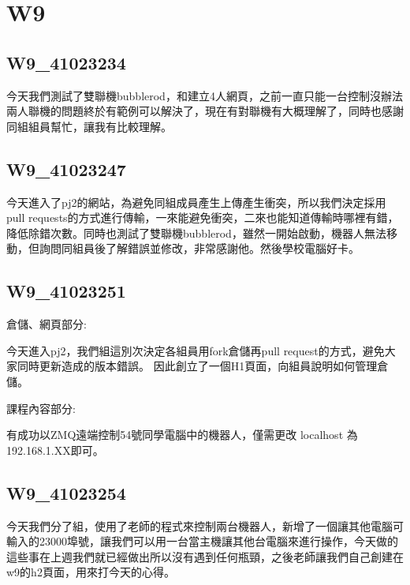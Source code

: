 \chapter{W9}


\section{W9\_41023234}

今天我們測試了雙聯機bubblerod，和建立4人網頁，之前一直只能一台控制沒辦法兩人聯機的問題終於有範例可以解決了，現在有對聯機有大概理解了，同時也感謝同組組員幫忙，讓我有比較理解。

\section{W9\_41023247}

今天進入了pj2的網站，為避免同組成員產生上傳產生衝突，所以我們決定採用pull requests的方式進行傳輸，一來能避免衝突，二來也能知道傳輸時哪裡有錯，降低除錯次數。同時也測試了雙聯機bubblerod，雖然一開始啟動，機器人無法移動，但詢問同組員後了解錯誤並修改，非常感謝他。然後學校電腦好卡。

\section{W9\_41023251}

倉儲、網頁部分:

今天進入pj2，我們組這別次決定各組員用fork倉儲再pull request的方式，避免大家同時更新造成的版本錯誤。
因此創立了一個H1頁面，向組員說明如何管理倉儲。


課程內容部分:

有成功以ZMQ遠端控制54號同學電腦中的機器人，僅需更改 localhost 為192.168.1.XX即可。

\section{W9\_41023254}

今天我們分了組，使用了老師的程式來控制兩台機器人，新增了一個讓其他電腦可輸入的23000埠號，讓我們可以用一台當主機讓其他台電腦來進行操作，今天做的這些事在上週我們就已經做出所以沒有遇到任何瓶頸，之後老師讓我們自己創建在w9的h2頁面，用來打今天的心得。


